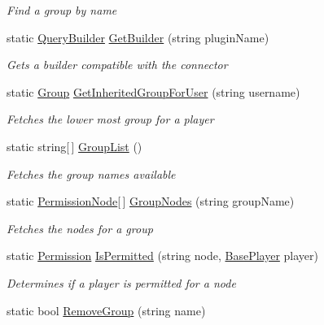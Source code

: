 \begin{DoxyCompactItemize}
\begin{DoxyCompactList}\small\item\em Find a group by name \end{DoxyCompactList}\item 
static \hyperlink{classOTA_1_1Data_1_1QueryBuilder}{Query\+Builder} \hyperlink{classOTA_1_1Data_1_1Storage_a760fbaf3b84ffeb61d49b680f2bb6e96}{Get\+Builder} (string plugin\+Name)
\begin{DoxyCompactList}\small\item\em Gets a builder compatible with the connector \end{DoxyCompactList}\item 
static \hyperlink{classOTA_1_1Data_1_1Group}{Group} \hyperlink{classOTA_1_1Data_1_1Storage_a69e850219dfc826ae2e212455a798c5c}{Get\+Inherited\+Group\+For\+User} (string username)
\begin{DoxyCompactList}\small\item\em Fetches the lower most group for a player \end{DoxyCompactList}\item 
static string\mbox{[}$\,$\mbox{]} \hyperlink{classOTA_1_1Data_1_1Storage_a1088a742986d8f51ddef9ddb5884567d}{Group\+List} ()
\begin{DoxyCompactList}\small\item\em Fetches the group names available \end{DoxyCompactList}\item 
static \hyperlink{structOTA_1_1Data_1_1PermissionNode}{Permission\+Node}\mbox{[}$\,$\mbox{]} \hyperlink{classOTA_1_1Data_1_1Storage_afd8887fe0cbeb807583c8b14e0785e4f}{Group\+Nodes} (string group\+Name)
\begin{DoxyCompactList}\small\item\em Fetches the nodes for a group \end{DoxyCompactList}\item 
static \hyperlink{namespaceOTA_1_1Data_a5335d23d62bc219ccbf40b018c002e8d}{Permission} \hyperlink{classOTA_1_1Data_1_1Storage_aea6304b830384f0be104f169632a0fa1}{Is\+Permitted} (string node, \hyperlink{classOTA_1_1BasePlayer}{Base\+Player} player)
\begin{DoxyCompactList}\small\item\em Determines if a player is permitted for a node \end{DoxyCompactList}\item 
static bool \hyperlink{classOTA_1_1Data_1_1Storage_a50d5625901d40320158413930f7bb441}{Remove\+Group} (string name)

\end{DoxyCompactItemize}
